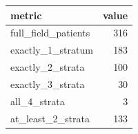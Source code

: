 \begin{tabular}{lr}
\toprule
metric & value \\
\midrule
full_field_patients & 316 \\
exactly_1_stratum & 183 \\
exactly_2_strata & 100 \\
exactly_3_strata & 30 \\
all_4_strata & 3 \\
at_least_2_strata & 133 \\
\bottomrule
\end{tabular}

